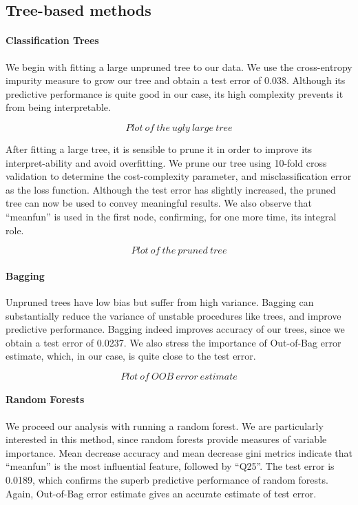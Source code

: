 \subsection{Tree-based methods}

\paragraph{Classification Trees}
We begin with fitting a large unpruned tree to our data. We use the cross-entropy impurity measure to grow our tree and obtain a test error of \num{0.038}. Although its predictive performance is quite good in our case, its high complexity prevents it from being interpretable.

$$ Plot ~ of ~ the ~ ugly ~ large ~tree$$


After fitting a large tree, it is sensible to prune it in order to improve its interpret-ability and avoid overfitting. We prune our tree using \num{10}-fold cross validation to determine the cost-complexity parameter, and misclassification error as the loss function. Although the test error has slightly increased, the pruned tree can now be used to convey meaningful results. We also observe that ``meanfun'' is used in the first node, confirming, for one more time, its integral role.

$$ Plot ~ of ~ the ~ pruned~ tree$$

\paragraph{Bagging}
Unpruned trees have low bias but suffer from high variance. Bagging can substantially reduce the variance of unstable procedures like trees, and improve predictive performance. Bagging indeed improves accuracy of our trees, since we obtain a test error of \num{0.0237}. We also stress the importance of Out-of-Bag error estimate, which, in our case, is quite close to the test error.

$$ Plot ~ of ~ OOB~error~ estimate$$ 

\paragraph{Random Forests}
We proceed our analysis with running a random forest. We are particularly interested in this method, since random forests provide measures of variable importance. Mean decrease accuracy and mean decrease gini metrics indicate that ``meanfun'' is the most influential feature, followed by ``Q25''. The test error is \num{0.0189}, which confirms the superb predictive performance of random forests. Again, Out-of-Bag error estimate gives an accurate estimate of test error.

